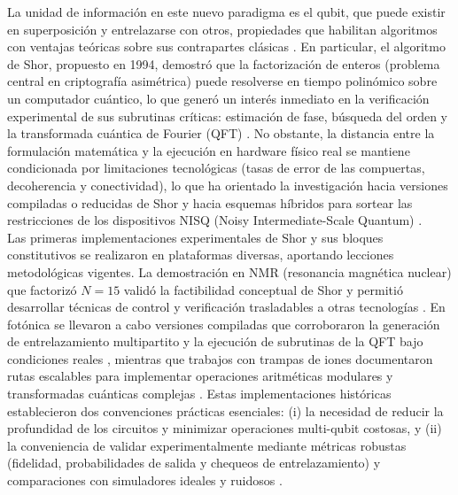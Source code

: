 \documentclass[12pt, spanish]{book}
\begin{document}
La unidad de información en este nuevo paradigma es el qubit, que puede existir en superposición y entrelazarse con otros, propiedades que habilitan algoritmos con ventajas teóricas sobre sus contrapartes clásicas \cite{Nielsen2024}. En particular, el algoritmo de Shor, propuesto en 1994, demostró que la factorización de enteros (problema central en criptografía asimétrica) puede resolverse en tiempo polinómico sobre un computador cuántico, lo que generó un interés inmediato en la verificación experimental de sus subrutinas críticas: estimación de fase, búsqueda del orden y la transformada cuántica de Fourier (QFT) \cite{Shor1994,Nielsen2024}. No obstante, la distancia entre la formulación matemática y la ejecución en hardware físico real se mantiene condicionada por limitaciones tecnológicas (tasas de error de las compuertas, decoherencia y conectividad), lo que ha orientado la investigación hacia versiones compiladas o reducidas de Shor y hacia esquemas híbridos para sortear las restricciones de los dispositivos NISQ (Noisy Intermediate-Scale Quantum) \cite{Vandersypen2001,Roffe2019}.\\

Las primeras implementaciones experimentales de Shor y sus bloques constitutivos se realizaron en plataformas diversas, aportando lecciones metodológicas vigentes. La demostración en NMR (resonancia magnética nuclear) que factorizó $N=15$ validó la factibilidad conceptual de Shor y permitió desarrollar técnicas de control y verificación trasladables a otras tecnologías \cite{Vandersypen2001}. En fotónica se llevaron a cabo versiones compiladas que corroboraron la generación de entrelazamiento multipartito y la ejecución de subrutinas de la QFT bajo condiciones reales \cite{Lanyon2007,Lu2007,Politi2009}, mientras que trabajos con trampas de iones documentaron rutas escalables para implementar operaciones aritméticas modulares y transformadas cuánticas complejas \cite{Rossi2022}. Estas implementaciones históricas establecieron dos convenciones prácticas esenciales: (i) la necesidad de reducir la profundidad de los circuitos y minimizar operaciones multi-qubit costosas, y (ii) la conveniencia de validar experimentalmente mediante métricas robustas (fidelidad, probabilidades de salida y chequeos de entrelazamiento) y comparaciones con simuladores ideales y ruidosos \cite{Vandersypen2001,Lanyon2007,Lu2007,Rossi2022}.\\
\end{document}

